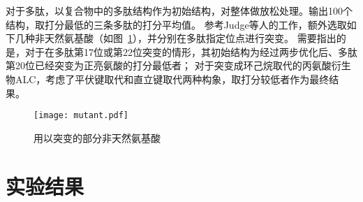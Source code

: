 对于多肽，以复合物中的多肽结构作为初始结构，对整体做放松处理。输出100个结构，取打分最低的三条多肽的打分平均值。
参考Judge等人的工作，额外选取如下几种非天然氨基酸（如图~\ref{fig:mutant}），并分别在多肽指定位点进行突变。
需要指出的是，对于在多肽第17位或第22位突变的情形，其初始结构为经过两步优化后、多肽第20位已经突变为正亮氨酸的打分最低者；
对于突变成环己烷取代的丙氨酸衍生物ALC，考虑了平伏键取代和直立键取代两种构象，取打分较低者作为最终结果。
\begin{figure}
  \centering
  \texttt{[image: mutant.pdf]}
  \caption{用以突变的部分非天然氨基酸}
  \label{fig:mutant}
\end{figure}



\section{实验结果}

